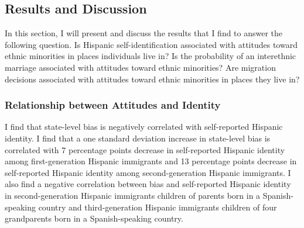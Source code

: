 \documentclass[12pt, fullpage]{article}
\begin{document}
\subsection{Results and Discussion} %
\label{sec:results}

In this section, I will present and discuss the results that I find to answer the following question. Is Hispanic self-identification associated with attitudes toward ethnic minorities in places individuals live in? Is the probability of an interethnic marriage associated with attitudes toward ethnic minorities? Are migration decisions associated with attitudes toward ethnic minorities in places they live in?

\subsubsection{Relationship between Attitudes and Identity}\label{sub:the_determinants_of_identity}

I find that state-level bias is negatively correlated with self-reported Hispanic identity. I find that a one standard deviation increase in state-level bias is correlated with 7 percentage points decrease in self-reported Hispanic identity among first-generation Hispanic immigrants and 13 percentage points decrease in self-reported Hispanic identity among second-generation Hispanic immigrants. I also find a negative correlation between bias and self-reported Hispanic identity in second-generation Hispanic immigrants children of parents born in a Spanish-speaking country and third-generation Hispanic immigrants children of four grandparents born in a Spanish-speaking country.


\end{document}

